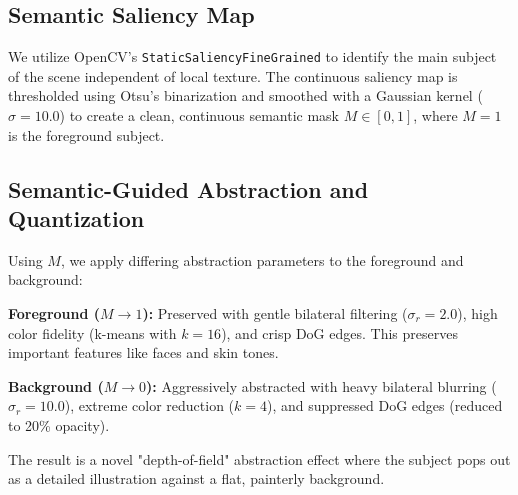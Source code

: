 \documentclass[conference]{IEEEtran}
\begin{document}
\subsection{Semantic Saliency Map}
We utilize OpenCV's \texttt{StaticSaliencyFineGrained} to identify the main subject of the scene independent of local texture. The continuous saliency map is thresholded using Otsu's binarization and smoothed with a Gaussian kernel ($\sigma = 10.0$) to create a clean, continuous semantic mask $M \in [0, 1]$, where $M=1$ is the foreground subject.

\subsection{Semantic-Guided Abstraction and Quantization}
Using $M$, we apply differing abstraction parameters to the foreground and background:

\textbf{Foreground ($M \to 1$):} Preserved with gentle bilateral filtering ($\sigma_r = 2.0$), high color fidelity (k-means with $k=16$), and crisp DoG edges. This preserves important features like faces and skin tones.

\textbf{Background ($M \to 0$):} Aggressively abstracted with heavy bilateral blurring ($\sigma_r = 10.0$), extreme color reduction ($k=4$), and suppressed DoG edges (reduced to 20\% opacity). 

The result is a novel "depth-of-field" abstraction effect where the subject pops out as a detailed illustration against a flat, painterly background.
\end{document}
